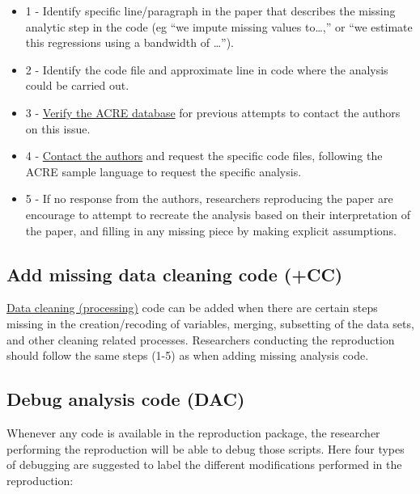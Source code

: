 \documentclass[]{book}
\providecommand{\tightlist}{%
  \setlength{\itemsep}{0pt}\setlength{\parskip}{0pt}}
\begin{document}
\begin{itemize}
\tightlist
\item
  1 - Identify specific line/paragraph in the paper that describes the missing analytic step in the code (eg ``we impute missing values to\ldots{},'' or ``we estimate this regressions using a bandwidth of \ldots{}'').\\
\item
  2 - Identify the code file and approximate line in code where the analysis could be carried out.\\
\item
  3 - \href{ADD\%20LINK}{Verify the ACRE database} for previous attempts to contact the authors on this issue.\\
\item
  4 - \protect\hyperlink{tips-for-communication}{Contact the authors} and request the specific code files, following the ACRE sample language to request the specific analysis.\\
\item
  5 - If no response from the authors, researchers reproducing the paper are encourage to attempt to recreate the analysis based on their interpretation of the paper, and filling in any missing piece by making explicit assumptions.
\end{itemize}

\hypertarget{add-missing-data-cleaning-code-cc}{%
\subsection{Add missing data cleaning code (+CC)}\label{add-missing-data-cleaning-code-cc}}

\protect\hyperlink{describe-inputs}{Data cleaning (processing)} code can be added when there are certain steps missing in the creation/recoding of variables, merging, subsetting of the data sets, and other cleaning related processes. Researchers conducting the reproduction should follow the same steps (1-5) as when adding missing analysis code.

\hypertarget{debug-analysis-code-dac}{%
\subsection{Debug analysis code (DAC)}\label{debug-analysis-code-dac}}

Whenever any code is available in the reproduction package, the researcher performing the reproduction will be able to debug those scripts. Here four types of debugging are suggested to label the different modifications performed in the reproduction:
\end{document}
